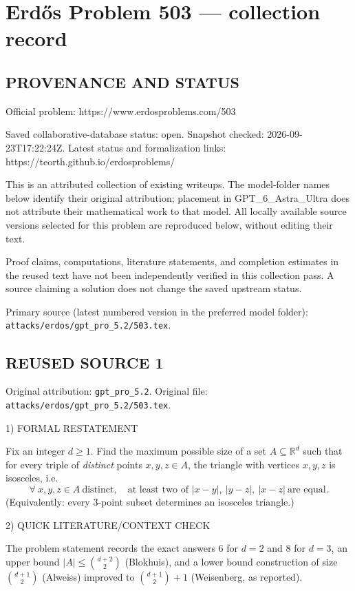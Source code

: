 \section*{Erd\H{o}s Problem 503 --- collection record}

\subsection*{PROVENANCE AND STATUS}
Official problem: https://www.erdosproblems.com/503

Saved collaborative-database status: open.
Snapshot checked: 2026-09-23T17:22:24Z.
Latest status and formalization links: https://teorth.github.io/erdosproblems/

This is an attributed collection of existing writeups. The model-folder names below identify their original attribution; placement in GPT\_6\_Astra\_Ultra does not attribute their mathematical work to that model. All locally available source versions selected for this problem are reproduced below, without editing their text.

Proof claims, computations, literature statements, and completion estimates in the reused text have not been independently verified in this collection pass. A source claiming a solution does not change the saved upstream status.

Primary source (latest numbered version in the preferred model folder): \texttt{attacks/erdos/gpt\_pro\_5.2/503.tex}.

\subsection*{REUSED SOURCE 1}
Original attribution: \texttt{gpt\_pro\_5.2}.
Original file: \texttt{attacks/erdos/gpt\_pro\_5.2/503.tex}.


1) FORMAL RESTATEMENT

Fix an integer $d\ge 1$.
Find the maximum possible size of a set $A\subseteq\mathbb R^d$ such that for every triple of \emph{distinct} points $x,y,z\in A$, the triangle with vertices $x,y,z$ is isosceles, i.e.
\[
\forall\ x,y,z\in A\ \text{distinct},\quad \text{at least two of }\lvert x-y\rvert,\ \lvert y-z\rvert,\ \lvert x-z\rvert\ \text{are equal}.
\]
(Equivalently: every 3-point subset determines an isosceles triangle.)

2) QUICK LITERATURE/CONTEXT CHECK

The problem statement records the exact answers $6$ for $d=2$ and $8$ for $d=3$, an upper bound $\lvert A\rvert\le \binom{d+2}{2}$ (Blokhuis), and a lower bound construction of size $\binom{d+1}{2}$ (Alweiss) improved to $\binom{d+1}{2}+1$ (Weisenberg, as reported).

